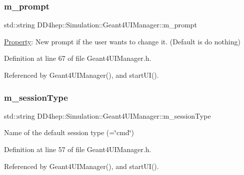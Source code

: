 \subsubsection{\texorpdfstring{m\+\_\+prompt}{m\_prompt}}
{\footnotesize\ttfamily std\+::string D\+D4hep\+::\+Simulation\+::\+Geant4\+U\+I\+Manager\+::m\+\_\+prompt\hspace{0.3cm}{\ttfamily [protected]}}



\hyperlink{class_d_d4hep_1_1_property}{Property}\+: New prompt if the user wants to change it. (Default is do nothing) 



Definition at line 67 of file Geant4\+U\+I\+Manager.\+h.



Referenced by Geant4\+U\+I\+Manager(), and start\+U\+I().

\hypertarget{class_d_d4hep_1_1_simulation_1_1_geant4_u_i_manager_aeef8066abb2d31001194f741f423a8b3}{}\label{class_d_d4hep_1_1_simulation_1_1_geant4_u_i_manager_aeef8066abb2d31001194f741f423a8b3} 
\subsubsection{\texorpdfstring{m\+\_\+session\+Type}{m\_sessionType}}
{\footnotesize\ttfamily std\+::string D\+D4hep\+::\+Simulation\+::\+Geant4\+U\+I\+Manager\+::m\+\_\+session\+Type\hspace{0.3cm}{\ttfamily [protected]}}



Name of the default session type (=\char`\"{}cmd\char`\"{}) 



Definition at line 57 of file Geant4\+U\+I\+Manager.\+h.



Referenced by Geant4\+U\+I\+Manager(), and start\+U\+I().

\hypertarget{class_d_d4hep_1_1_simulation_1_1_geant4_u_i_manager_aeec06cd94ff75bad4130a535145be277}{}\label{class_d_d4hep_1_1_simulation_1_1_geant4_u_i_manager_aeec06cd94ff75bad4130a535145be277} 
